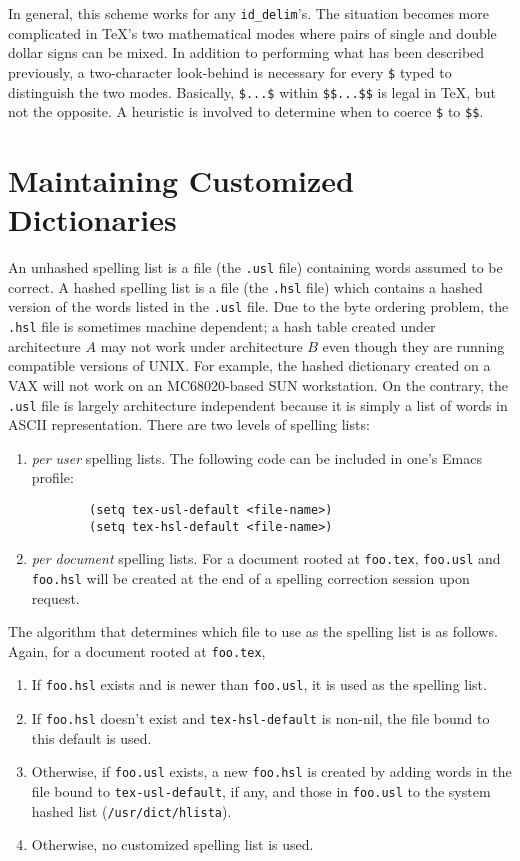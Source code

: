In general, this scheme works for any \verb|id_delim|'s.
The situation becomes more complicated in {\TeX}'s two mathematical modes where
pairs of single and double dollar signs can be mixed.
In addition to performing what has been described previously,
a two-character look-behind is necessary for every \verb|$|
typed to distinguish the two modes.  Basically, \verb|$...$| within
\verb|$$...$$| is legal in {\TeX}, but not the opposite.
A heuristic is involved to determine when to coerce \verb|$| to \verb|$$|.


\section{Maintaining Customized Dictionaries}
An unhashed spelling list is a file (the \verb|.usl| file) containing words 
assumed to be correct.
A hashed spelling list is a file (the \verb|.hsl| file) which contains a
hashed version of the words listed in the \verb|.usl| file.
Due to the byte ordering problem, 
the \verb|.hsl| file is sometimes machine dependent; a hash table
created under architecture $A$ may not work under architecture $B$ even
though they are running compatible versions of UNIX.
For example, the hashed dictionary created on a VAX will not work on
an MC68020-based SUN workstation.
On the contrary, the \verb|.usl| file is largely architecture
independent because it is
simply a list of words in ASCII representation.
There are two levels of spelling lists:
\begin{enumerate}
\item {\it per user\/} spelling lists.  The following code can be 
	included in one's Emacs profile:
	\begin{verbatim}
        (setq tex-usl-default <file-name>)
        (setq tex-hsl-default <file-name>)
	\end{verbatim}
\item {\it per document\/} spelling lists.  For a document rooted at
	\verb|foo.tex|, \verb|foo.usl| and \verb|foo.hsl| will be created at
	the end of a spelling correction session upon request.
\end{enumerate}

The algorithm that determines which file to use as the spelling list is
as follows.  Again, for a document rooted at \verb|foo.tex|,
\begin{enumerate}
\item If \verb|foo.hsl| exists and is newer than \verb|foo.usl|,
	it is used as the spelling list.
\item If \verb|foo.hsl| doesn't exist and \verb|tex-hsl-default| is non-nil,
	the file bound to this default is used.
\item Otherwise, if \verb|foo.usl| exists, a new \verb|foo.hsl| is created
	by adding words in the file bound to \verb|tex-usl-default|, if any,
	and those in \verb|foo.usl| to the system hashed list
	(\verb|/usr/dict/hlista|).
\item Otherwise, no customized spelling list is used.
\end{enumerate}

